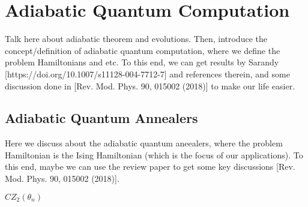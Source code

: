 \section{Adiabatic Quantum Computation}
\label{Section:AQC}


Talk here about adiabatic theorem and evolutions. Then, introduce the concept/definition of adiabatic quantum computation, where we define the problem Hamiltonians and etc. To this end, we can get results by Sarandy [https://doi.org/10.1007/s11128-004-7712-7] and references therein, and some discussion done in [Rev. Mod. Phys. 90, 015002 (2018)] to make our life easier.

\lipsum[1-2]

\subsection{Adiabatic Quantum Annealers}

Here we discuss about the adiabatic quantum aneealers, where the problem Hamiltonian is the Ising Hamiltonian (which is the focus of our applications). To this end, maybe we can use the review paper to get some key discussions [Rev. Mod. Phys. 90, 015002 (2018)].

$CZ_{2}(\theta_{n})$

\lipsum[1-2]





